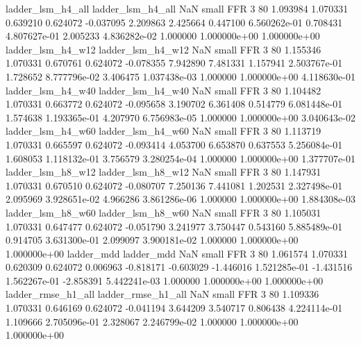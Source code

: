        ladder_lsm_h4_all        ladder_lsm_h4_all                   NaN      small      FFR                 3 80 1.093984       1.070331 0.639210       0.624072   -0.037095      2.209863      2.425664     0.447100   6.560262e-01  0.708431 4.807627e-01     2.005233   4.836282e-02            1.000000    1.000000e+00        1.000000e+00
       ladder_lsm_h4_w12        ladder_lsm_h4_w12                   NaN      small      FFR                 3 80 1.155346       1.070331 0.670761       0.624072   -0.078355      7.942890      7.481331     1.157941   2.503767e-01  1.728652 8.777796e-02     3.406475   1.037438e-03            1.000000    1.000000e+00        4.118630e-01
       ladder_lsm_h4_w40        ladder_lsm_h4_w40                   NaN      small      FFR                 3 80 1.104482       1.070331 0.663772       0.624072   -0.095658      3.190702      6.361408     0.514779   6.081448e-01  1.574638 1.193365e-01     4.207970   6.756983e-05            1.000000    1.000000e+00        3.040643e-02
       ladder_lsm_h4_w60        ladder_lsm_h4_w60                   NaN      small      FFR                 3 80 1.113719       1.070331 0.665597       0.624072   -0.093414      4.053700      6.653870     0.637553   5.256084e-01  1.608053 1.118132e-01     3.756579   3.280254e-04            1.000000    1.000000e+00        1.377707e-01
       ladder_lsm_h8_w12        ladder_lsm_h8_w12                   NaN      small      FFR                 3 80 1.147931       1.070331 0.670510       0.624072   -0.080707      7.250136      7.441081     1.202531   2.327498e-01  2.095969 3.928651e-02     4.966286   3.861286e-06            1.000000    1.000000e+00        1.884308e-03
       ladder_lsm_h8_w60        ladder_lsm_h8_w60                   NaN      small      FFR                 3 80 1.105031       1.070331 0.647477       0.624072   -0.051790      3.241977      3.750447     0.543160   5.885489e-01  0.914705 3.631300e-01     2.099097   3.900181e-02            1.000000    1.000000e+00        1.000000e+00
              ladder_mdd               ladder_mdd                   NaN      small      FFR                 3 80 1.061574       1.070331 0.620309       0.624072    0.006963     -0.818171     -0.603029    -1.446016   1.521285e-01 -1.431516 1.562267e-01    -2.858391   5.442241e-03            1.000000    1.000000e+00        1.000000e+00
      ladder_rmse_h1_all       ladder_rmse_h1_all                   NaN      small      FFR                 3 80 1.109336       1.070331 0.646169       0.624072   -0.041194      3.644209      3.540717     0.806438   4.224114e-01  1.109666 2.705096e-01     2.328067   2.246799e-02            1.000000    1.000000e+00        1.000000e+00
